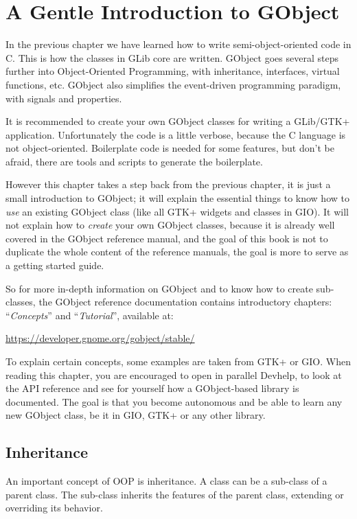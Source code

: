 \chapter{A Gentle Introduction to GObject}
\label{oop-gobject}

In the previous chapter we have learned how to write semi-object-oriented code in C. This is how the classes in GLib core are written. GObject goes several steps further into Object-Oriented Programming, with inheritance, interfaces, virtual functions, etc. GObject also simplifies the event-driven programming paradigm, with signals and properties.

It is recommended to create your own GObject classes for writing a GLib/GTK+ application. Unfortunately the code is a little verbose, because the C language is not object-oriented. Boilerplate code is needed for some features, but don't be afraid, there are tools and scripts to generate the boilerplate.

However this chapter takes a step back from the previous chapter, it is just a small introduction to GObject; it will explain the essential things to know how to \emph{use} an existing GObject class (like all GTK+ widgets and classes in GIO). It will not explain how to \emph{create} your own GObject classes, because it is already well covered in the GObject reference manual, and the goal of this book is not to duplicate the whole content of the reference manuals, the goal is more to serve as a getting started guide.

So for more in-depth information on GObject and to know how to create sub-classes, the GObject reference documentation contains introductory chapters: ``\emph{Concepts}'' and ``\emph{Tutorial}'', available at:

\url{https://developer.gnome.org/gobject/stable/}

To explain certain concepts, some examples are taken from GTK+ or GIO. When reading this chapter, you are encouraged to open in parallel Devhelp, to look at the API reference and see for yourself how a GObject-based library is documented. The goal is that you become autonomous and be able to learn any new GObject class, be it in GIO, GTK+ or any other library.

\section{Inheritance}

An important concept of OOP is inheritance. A class can be a sub-class of a parent class. The sub-class inherits the features of the parent class, extending or overriding its behavior.

